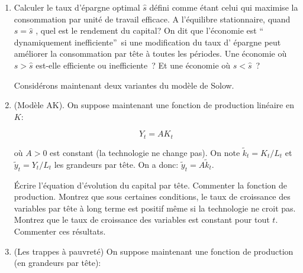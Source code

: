 \documentclass[11pt,a4paper]{article}
\begin{document}
\begin{enumerate}
\item Calculer le taux d'\'{e}pargne optimal $\widehat{s}$ d\'{e}fini comme 
\'{e}tant celui qui maximise la consommation par unit\'{e} de travail
efficace. A l'\'{e}quilibre stationnaire, quand $s=\widehat{s}$ , quel est
le rendement du capital? On dit que l'\'{e}conomie est \textquotedblleft
dynamiquement inefficiente\textquotedblright\ si une modification du taux d'%
\'{e}pargne peut am\'{e}liorer la consommation par t\^{e}te \`{a} toutes les
p\'{e}riodes. Une \'{e}conomie o\`{u} $s>\widehat{s}$ est-elle efficiente ou
inefficiente~? Et une \'{e}conomie o\`{u} $s<\widehat{s}$~? 

\bigskip 

Considérons maintenant deux variantes du modèle de Solow. 
%

\item (Mod\`{e}le AK). On suppose maintenant une fonction de production lin\'{e}aire en $K$: 

\begin{equation*}
Y_{t}=A K_{t}
\end{equation*}%

o\`{u} $A>0$ est constant (la technologie ne change pas). On note $\tilde{k}_{t}=K_{t}/L_{t}$ et $\tilde{y}_{t}=Y_{t}/L_{t}$ les grandeurs par t\^{e}te.  On a donc:  $\tilde{y}_t=A \tilde{k}_t $. 


\'{E}crire l'\'{e}quation d'\'{e}volution du capital par t\^{e}te. Commenter la fonction de production. Montrez que sous certaines conditions, le taux de croissance des variables par t\^{e}te \`{a} long terme est positif m\^{e}me si la technologie ne croit pas. Montrez que le taux de croissance des variables est constant pour tout $t$. Commenter ces r\'{e}sultats.

\item (Les trappes à pauvreté)  On suppose maintenant une fonction de production (en grandeurs par t\^{e}te): 


\end{enumerate}
\end{document}
